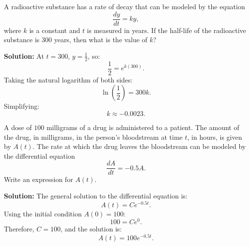 \documentclass[12pt]{article}
\theoremstyle{beautifulthm}
\begin{document}
\begin{tcolorbox}[colback=examplebg, colframe=red!75!black, title=\textbf{EXAMPLE 2: 
Using an Exponential Growth Model}, fonttitle=\bfseries, sharp corners]
A radioactive substance has a rate of decay that can be modeled by the equation 
    \[
    \frac{dy}{dt} = ky,
    \]
    where $k$ is a constant and $t$ is measured in years. If the half-life of the radioactive substance is $300$ years, then what is the value of $k$?


\tcblower
\textbf{Solution:} 
    At $t = 300$, $y = \frac{1}{2}$, so:
    \[
    \frac{1}{2} = e^{k(300)}.
    \]
    Taking the natural logarithm of both sides:
    \[
    \ln\left(\frac{1}{2}\right) = 300k.
    \]
    Simplifying:
    \[
    k \approx -0.0023.
    \]
\end{tcolorbox}


\begin{tcolorbox}[colback=examplebg, colframe=red!75!black, title=\textbf{EXAMPLE 3: Using an Exponential Growth Model}, fonttitle=\bfseries, sharp corners]

A dose of $100$ milligrams of a drug is administered to a patient. The amount of the drug, in milligrams, in the person’s bloodstream at time $t$, in hours, is given by $A(t)$. The rate at which the drug leaves the bloodstream can be modeled by the differential equation
    \[
    \frac{dA}{dt} = -0.5A.
    \]
    Write an expression for $A(t)$.

\tcblower
\textbf{Solution:} 
    The general solution to the differential equation is:
    \[
    A(t) = Ce^{-0.5t}.
    \]
    Using the initial condition $A(0) = 100$:
    \[
    100 = Ce^{0}.
    \]
    Therefore, $C = 100$, and the solution is:
    \[
    A(t) = 100e^{-0.5t}.
    \]
\end{tcolorbox}
\end{document}
